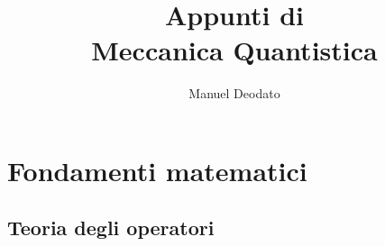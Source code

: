 \documentclass[12pt]{scrartcl}
\title{Appunti di\\ \vspace{.3cm} Meccanica Quantistica}
\author{Manuel Deodato}
\date{}
\theoremstyle{style}
\renewcommand{\maketitle}{
\begin{center}
{\sffamily
{\fontsize{20}{20}\selectfont\MakeUppercase\thetitle}}

\vspace{0.2in}

{\large\scshape\theauthor}
\end{center}
}
\numberwithin{equation}{subsection}
\begin{document}
\maketitle
\newpage
\tableofcontents 
\newpage
\section{Fondamenti matematici}
\subsection{Teoria degli operatori}
\end{document}
